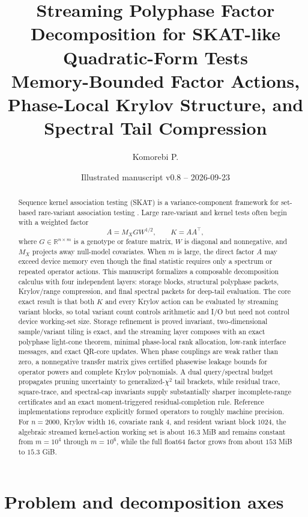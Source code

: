 \documentclass[11pt]{article}
\title{\textbf{Streaming Polyphase Factor Decomposition for SKAT-like Quadratic-Form Tests}\\
\large Memory-Bounded Factor Actions, Phase-Local Krylov Structure, and Spectral Tail Compression}
\author{Komorebi P.}
\date{Illustrated manuscript v0.8 -- 2026-09-23}
\theoremstyle{definition}
\theoremstyle{remark}
\begin{document}
\maketitle

\begin{abstract}
Sequence kernel association testing (SKAT) is a variance-component framework for set-based rare-variant association testing \cite{Wu2011}. Large rare-variant and kernel tests often begin with a weighted factor
\[
A=M_XGW^{1/2},
\qquad
K=AA^\top,
\]
where \(G\in\mathbb R^{n\times m}\) is a genotype or feature matrix,
\(W\) is diagonal and nonnegative, and \(M_X\) projects away null-model
covariates.  When \(m\) is large, the direct factor \(A\) may exceed device
memory even though the final statistic requires only a spectrum or repeated
operator actions.  This manuscript formalizes a composable decomposition
calculus with four independent layers: storage blocks, structural
polyphase packets, Krylov/range compression, and final spectral packets for
deep-tail evaluation.  The core exact result is that both \(K\) and every
Krylov action can be evaluated by streaming variant blocks, so total variant
count controls arithmetic and I/O but need not control device working-set
size.  Storage refinement is proved invariant, two-dimensional sample/variant
tiling is exact, and the streaming layer composes with an exact polyphase
light-cone theorem, minimal phase-local rank allocation, low-rank interface
messages, and exact QR-core updates.  When phase couplings are weak rather
than zero, a nonnegative transfer matrix gives certified phasewise leakage
bounds for operator powers and complete Krylov polynomials.  A dual
query/spectral budget propagates pruning uncertainty to generalized-\(\chi^2\)
tail brackets, while residual trace, square-trace, and spectral-cap invariants
supply substantially sharper incomplete-range certificates and an exact
moment-triggered residual-completion rule.
Reference implementations reproduce
explicitly formed operators to roughly machine precision.  For
\(n=2000\), Krylov width \(16\), covariate rank \(4\), and resident variant
block \(1024\), the algebraic streamed kernel-action working set is about
\(16.3\) MiB and remains constant from \(m=10^4\) through \(m=10^6\), while
the full float64 factor grows from about \(153\) MiB to \(15.3\) GiB.
\end{abstract}

\tableofcontents
\clearpage

\section{Problem and decomposition axes}
\end{document}
